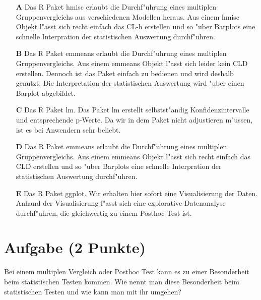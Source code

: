 \documentclass[a4paper, 9pt]{scrartcl}\usepackage[]{graphicx}\usepackage[]{xcolor}
\begin{document}
\begin{enumerate}
\item [\textbf{A} \msquare] Das R Paket hmisc erlaubt die Durchf{"u}hrung eines multiplen Gruppenvergleichs aus verschiedenen Modellen heraus. Aus einem hmisc Objekt l{"a}sst sich recht einfach das CL-h erstellen und so {"u}ber Barplots eine schnelle Interpration der statistischen Auswertung durchf{"u}hren.
\item [\textbf{B} \msquare] Das R Paket emmeans erlaubt die Durchf{"u}hrung eines multiplen Gruppenvergleichs. Aus einem emmeans Objekt l{"a}sst sich leider kein CLD erstellen. Dennoch ist das Paket einfach zu bedienen und wird deshalb genutzt. Die Interpretation der statistischen Auswertung wird {"u}ber einen Barplot abgebildet.
\item [\textbf{C} \msquare] Das R Paket lm. Das Paket lm erstellt selbstst{"a}ndig Konfidenzintervalle und entsprechende p-Werte. Da wir in dem Paket nicht adjustieren m{"u}ssen, ist es bei Anwendern sehr beliebt.
\item [\textbf{D} \msquare] Das R Paket emmeans erlaubt die Durchf{"u}hrung eines multiplen Gruppenvergleichs. Aus einem emmeans Objekt l{"a}sst sich recht einfach das CLD erstellen und so {"u}ber Barplots eine schnelle Interpration der statistischen Auswertung durchf{"u}hren.
\item [\textbf{E} \msquare] Das R Paket ggplot. Wir erhalten hier sofort eine Visualisierung der Daten. Anhand der Visualisierung l{"a}sst sich eine explorative Datenanalyse durchf{"u}hren, die gleichwertig zu einem Posthoc-Test ist.
\end{enumerate}

\section{Aufgabe \hfill (2 Punkte)}

Bei einem multiplen Vergleich oder Posthoc Test kann es zu einer Besonderheit beim
statistischen Testen kommen. Wie nennt man diese Besonderheit beim
statistischen Testen und wie kann man mit ihr umgehen?
\end{document}
